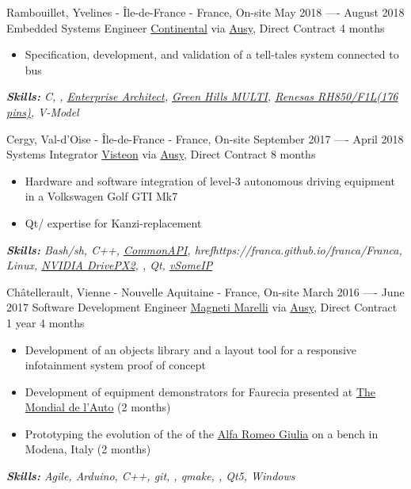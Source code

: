 \documentclass[11pt,a4paper,roman]{moderncv}
\begin{document}
\cventry
{Rambouillet, Yvelines - Île-de-France - France, On-site}
{May 2018 —- August 2018}
{Embedded Systems Engineer}
{\href{https://www.continental.com/en}{Continental} via \href{https://www.ausy.com/en}{Ausy}, Direct Contract}
{4 months}
{}
{
\begin{itemize}
	\item Specification, development, and validation of a tell-tales system connected to  bus
\end{itemize}
{\textcolor{color2}{\textit{\textbf{Skills:}
	C,
	,
	\href{https://sparxsystems.com/products/ea/index.html}{Enterprise Architect},
	\href{https://www.ghs.com/products/multi.html}{Green Hills MULTI},
	\href{https://www.renesas.com/eu/en/products/microcontrollers-microprocessors/rh850/rh850f1x/rh850f1l.html}{Renesas RH850/F1L(176 pins)},
	V-Model
	\newline
}}}}


\cventry
{Cergy, Val-d'Oise - Île-de-France - France, On-site}
{September 2017 —- April 2018}
{Systems Integrator}
{\href{https://www.visteon.com}{Visteon} via \href{https://www.ausy.com/en}{Ausy}, Direct Contract}
{8 months}
{}
{
\begin{itemize}
	\item Hardware and software integration of level-3 autonomous driving equipment in a Volkswagen Golf GTI Mk7
	\item Qt/ expertise for Kanzi-replacement
\end{itemize}
{\textcolor{color2}{\textit{\textbf{Skills:}
	Bash/sh,
	C++,
	\href{https://github.com/GENIVI/capicxx-core-runtime}{CommonAPI},
	href{https://franca.github.io/franca/}{Franca},
	Linux,
	\href{https://www.nvidia.com/content/nvidiaGDC/sg/en_SG/self-driving-cars/drive-px/}{NVIDIA Drive\texttrademark PX2},
	,
	Qt,
	\href{https://github.com/GENIVI/vsomeip}{vSomeIP}
	\newline
}}}}


\cventry
{Châtellerault, Vienne - Nouvelle Aquitaine - France, On-site}
{March 2016 —- June 2017}
{Software Development Engineer}
{\href{https://www.marelli.com}{Magneti Marelli} via \href{https://www.ausy.com/en}{Ausy}, Direct Contract}
{1 year 4 months}
{}
{
\begin{itemize}
	\item Development of an objects library and a layout tool for a responsive infotainment system proof of concept
	\item Development of equipment demonstrators for Faurecia presented at \href{https://mondial.paris/en/mondial-de-lauto}{The Mondial de l'Auto} (2 months)
	\item Prototyping the evolution of the  of the \href{https://www.alfaromeo.com/giulia}{Alfa Romeo Giulia} on a bench in Modena, Italy (2 months)
\end{itemize}
{\textcolor{color2}{\textit{\textbf{Skills:}
	Agile,
	Arduino,
	C++,
	git,
	,
	qmake,
   ,
	Qt5,
	Windows
	\newline
}}}}
\end{document}
